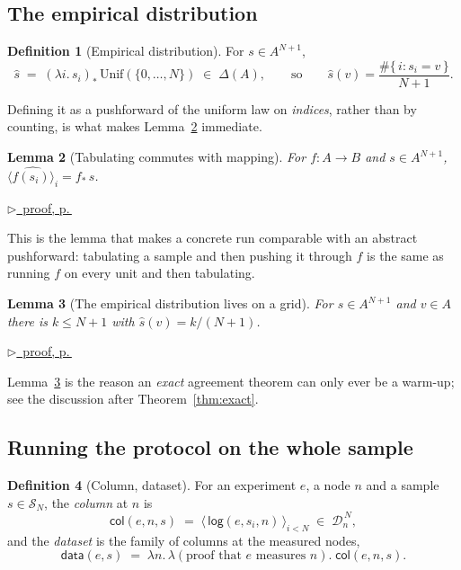 \documentclass[11pt,a4paper]{article}
\theoremstyle{definition}
\newtheorem{definition}{Definition}[section]
\theoremstyle{plain}
\newtheorem{lemma}[definition]{Lemma}
\theoremstyle{remark}
\newcommand{\dom}{\mathcal{D}}
\newcommand{\Dist}[1]{\Delta(#1)}      %
\newcommand{\push}[1]{{#1}_{*}}        %
\newcommand{\Smp}{\mathcal{S}}         %
\newcommand{\emp}[1]{\widehat{#1}}
\newcommand{\logv}{\mathsf{log}}
\newcommand{\pfref}[1]{%
  \par\smallskip\noindent
  \hyperref[pf:#1]{\small$\triangleright$\ proof, p.\,\pageref{pf:#1}}\par\smallskip}
\begin{document}
\subsection{The empirical distribution}

\begin{definition}[Empirical distribution]
For $s \in A^{N+1}$,
\[
  \emp{s} \;=\; \push{(\lambda i.\, s_i)}\,\mathrm{Unif}(\{0,\dots,N\})
  \;\in\; \Dist{A},
  \qquad\text{so}\qquad
  \emp{s}(v) = \frac{\#\{\,i : s_i = v\,\}}{N+1}.
\]
\end{definition}

Defining it as a pushforward of the uniform law on \emph{indices}, rather
than by counting, is what makes Lemma~\ref{lem:empmap} immediate.

\begin{lemma}[Tabulating commutes with mapping]
\label{lem:empmap}
For $f : A \to B$ and $s \in A^{N+1}$, \;
$\emp{\langle f(s_i)\rangle_i} = \push{f}\,\emp{s}$.
\end{lemma}

\pfref{lem:empmap}

This is the lemma that makes a concrete run comparable with an abstract
pushforward: tabulating a sample and then pushing it through $f$ is the
same as running $f$ on every unit and then tabulating.

\begin{lemma}[The empirical distribution lives on a grid]
\label{lem:grid}
For $s \in A^{N+1}$ and $v \in A$ there is $k \le N+1$ with
$\emp{s}(v) = k/(N+1)$.
\end{lemma}

\pfref{lem:grid}

Lemma~\ref{lem:grid} is the reason an \emph{exact} agreement theorem can
only ever be a warm-up; see the discussion after
Theorem~\ref{thm:exact}.

\subsection{Running the protocol on the whole sample}
\label{sec:dataset}

\begin{definition}[Column, dataset]
For an experiment $e$, a node $n$ and a sample $s \in \Smp_N$, the
\emph{column} at $n$ is
\[
  \mathsf{col}(e,n,s) \;=\; \bigl\langle\, \logv(e, s_i, n) \,\bigr\rangle_{i < N}
  \;\in\; \dom_n^{\,N},
\]
and the \emph{dataset} is the family of columns at the measured nodes,
\[
  \mathsf{data}(e,s) \;=\; \lambda n.\,\lambda (\text{proof that } e \text{ measures } n).\;
  \mathsf{col}(e,n,s).
\]
\end{definition}
\end{document}
